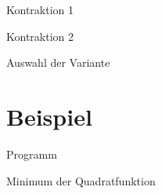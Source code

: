 \documentclass[\outputformat]{beamer}
\begin{document}
\begin{frame}{Kontraktion 1}

\end{frame}

\begin{frame}{Kontraktion 2}

\end{frame}

\begin{frame}{Auswahl der Variante}

\end{frame}


\section{Beispiel}
\begin{frame}{Programm}\tableofcontents[currentsection]\end{frame}

\begin{frame}{Minimum der Quadratfunktion}

\end{frame}
\end{document}
